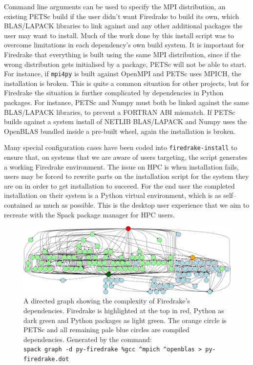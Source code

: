 \documentclass[a4paper,11pt]{article}
\begin{document}
Command line arguments can be used to specify the MPI distribution, an existing PETSc build if the user didn't want Firedrake to build its own, which BLAS/LAPACK libraries to link against and any other additional packages the user may want to install.
Much of the work done by this install script was to overcome limitations in each dependency's own build system.
It is important for Firedrake that everything is built using the same MPI distribution, since if the wrong distribution gets initialised by a package, PETSc will not be able to start.
For instance, if \verb`mpi4py` is built against OpenMPI and PETSc uses MPICH, the installation is broken.
This is quite a common situation for other projects, but for Firedrake the situation is further complicated by dependencies in Python packages.
For instance, PETSc and Numpy must both be linked against the same BLAS/LAPACK libraries, to prevent a FORTRAN ABI mismatch.
If PETSc builds against a system install of NETLIB BLAS/LAPACK and Numpy uses the OpenBLAS bundled inside a pre-built wheel, again the installation is broken.

Many special configuration cases have been coded into \verb`firedrake-install` to ensure that, on systems that we are aware of users targeting, the script generates a working Firedrake environment.
The issue on HPC is when installation fails, users may be forced to rewrite parts on the installation script for the system they are on in order to get installation to succeed.
For the end user the completed installation on their system is a Python virtual environment, which is as self--contained as much as possible.
This is the desktop user experience that we aim to recreate with the Spack package manager for HPC users.

\begin{figure}[htp]
	\centering
	\includegraphics[width=\textwidth]{firedrake_deps.png}
	\caption{A directed graph showing the complexity of Firedrake's dependencies. Firedrake is highlighted at the top in red, Python as dark green and Python packages as light green. The orange circle is PETSc and all remaining pale blue circles are compiled dependencies. Generated by the command:\\ \texttt{spack graph -d py-firedrake \%gcc \^{}mpich \^{}openblas \textgreater{} py-firedrake.dot}}
	\label{fig:fddeps}
\end{figure}
\end{document}
